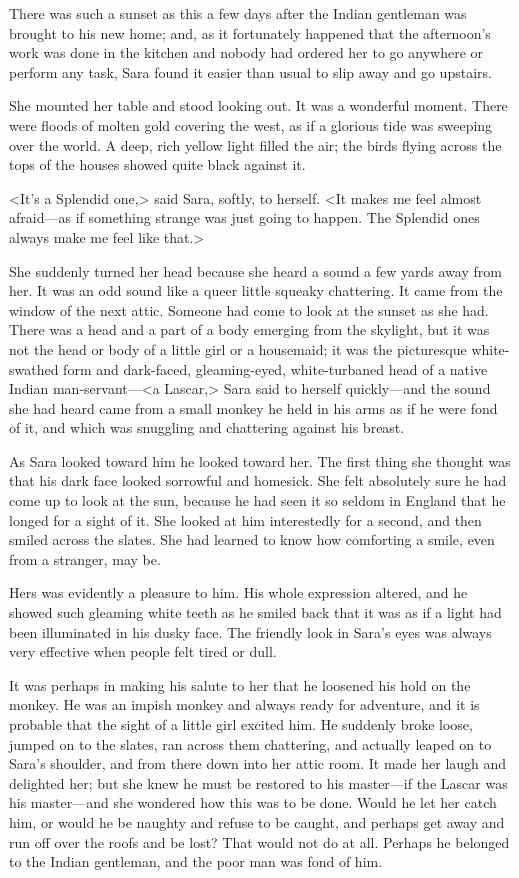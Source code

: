 There was such a sunset as this a few days after the Indian gentleman was brought to his new home; and, as it fortunately happened that the afternoon's work was done in the kitchen and nobody had ordered her to go anywhere or perform any task, Sara found it easier than usual to slip away and go upstairs.

She mounted her table and stood looking out. It was a wonderful moment. There were floods of molten gold covering the west, as if a glorious tide was sweeping over the world. A deep, rich yellow light filled the air; the birds flying across the tops of the houses showed quite black against it.

<It's a Splendid one,> said Sara, softly, to herself. <It makes me feel almost afraid—as if something strange was just going to happen. The Splendid ones always make me feel like that.>

She suddenly turned her head because she heard a sound a few yards away from her. It was an odd sound like a queer little squeaky chattering. It came from the window of the next attic. Someone had come to look at the sunset as she had. There was a head and a part of a body emerging from the skylight, but it was not the head or body of a little girl or a housemaid; it was the picturesque white-swathed form and dark-faced, gleaming-eyed, white-turbaned head of a native Indian man-servant—<a Lascar,> Sara said to herself quickly—and the sound she had heard came from a small monkey he held in his arms as if he were fond of it, and which was snuggling and chattering against his breast.

As Sara looked toward him he looked toward her. The first thing she thought was that his dark face looked sorrowful and homesick. She felt absolutely sure he had come up to look at the sun, because he had seen it so seldom in England that he longed for a sight of it. She looked at him interestedly for a second, and then smiled across the slates. She had learned to know how comforting a smile, even from a stranger, may be.

Hers was evidently a pleasure to him. His whole expression altered, and he showed such gleaming white teeth as he smiled back that it was as if a light had been illuminated in his dusky face. The friendly look in Sara's eyes was always very effective when people felt tired or dull.

It was perhaps in making his salute to her that he loosened his hold on the monkey. He was an impish monkey and always ready for adventure, and it is probable that the sight of a little girl excited him. He suddenly broke loose, jumped on to the slates, ran across them chattering, and actually leaped on to Sara's shoulder, and from there down into her attic room. It made her laugh and delighted her; but she knew he must be restored to his master—if the Lascar was his master—and she wondered how this was to be done. Would he let her catch him, or would he be naughty and refuse to be caught, and perhaps get away and run off over the roofs and be lost? That would not do at all. Perhaps he belonged to the Indian gentleman, and the poor man was fond of him.

